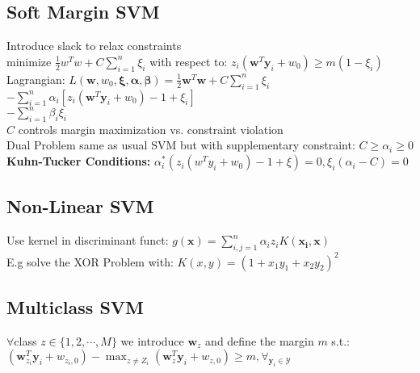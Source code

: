 \subsection*{Soft Margin SVM}
Introduce slack to relax constraints\\
minimize $\frac{1}{2}w^Tw + C\sum_{i=1}^n \xi_i$ with respect to: 
$z_i(\mathbf{w}^T\mathbf{y}_i+w_0)\geq m(1-\xi_i)$\\
Lagrangian: $L(\mathbf{w}, w_0,\mathbf{\xi}, \mathbf{\alpha}, \mathbf{\beta}) {=}\frac{1}{2}\mathbf{w}^T\mathbf{w}+C\sum_{i=1}^n\xi_i$
${-}\sum_{i=1}^n\alpha_i[z_i(\mathbf{w}^T\mathbf{y}_i{+}w_0){-}1{+}\xi_i]$\\
${-}\sum_{i=1}^n\beta_i\xi_i$\\
$C$ controls margin maximization vs. constraint violation\\
Dual Problem same as usual SVM but with supplementary constraint:
$C \geq \alpha_i \geq 0$
\textbf{Kuhn-Tucker Conditions:} 
$\alpha_i^*(z_i(w^Ty_i+w_0)-1 + \xi)= 0, \xi_i(\alpha_i-C) = 0$
\subsection*{Non-Linear SVM}
Use kernel in discriminant funct: $g(\mathbf{x})=\sum_{i,j=1}^n\alpha_iz_iK(\mathbf{x_i},\mathbf{x})$\\
E.g solve the XOR Problem with:
$K(x,y)=(1+x_1y_1+x_2y_2)^2$

\subsection*{Multiclass SVM}
$\forall$class $z\in\{1,2,\cdots,M\}$ we introduce $\mathbf{w}_z$ and define the margin $m$ s.t.:\\
$(\mathbf{w}_{z_i}^T\mathbf{y}_i+w_{z_i,0})-\max_{z\not=Z_i}(\mathbf{w}_z^T\mathbf{y}_i+w_{z,0})\geq m, \forall_{\mathbf{y}_i\in \mathcal{Y}}$

